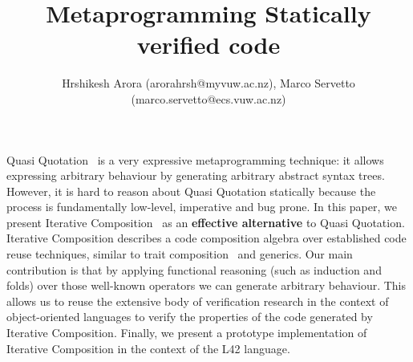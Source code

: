 \documentclass[a4paper,twoside,british,9pt]{extarticle}
\begin{document}
\title{Metaprogramming Statically verified code \vspace{-2ex}}
\author{
Hrshikesh Arora (arorahrsh@myvuw.ac.nz), Marco Servetto (marco.servetto@ecs.vuw.ac.nz)}
\date{}
\maketitle
\vspace{-5ex}
Quasi Quotation~\cite{moggi1999idealized,sheard2002template}
is a very expressive metaprogramming technique: it allows expressing arbitrary behaviour by
generating arbitrary abstract syntax trees.
However, it is hard to reason about Quasi Quotation statically because
the process is fundamentally low-level, imperative and bug prone.
In this paper, we present Iterative Composition~\cite{servetto2014meta} as
an \textbf{effective alternative} to Quasi Quotation.
Iterative Composition describes a code composition algebra over established code reuse techniques,
similar to trait composition~\cite{scharli2003traits} and generics.
Our main contribution is that by applying functional reasoning (such as induction and folds)
over those well-known operators we can generate arbitrary behaviour.
This allows us to reuse the extensive body of verification research in the 
context of object-oriented languages to verify the properties
of the code generated by Iterative Composition.
Finally, we present a prototype implementation of Iterative Composition in the context of the L42 language.
\end{document}
